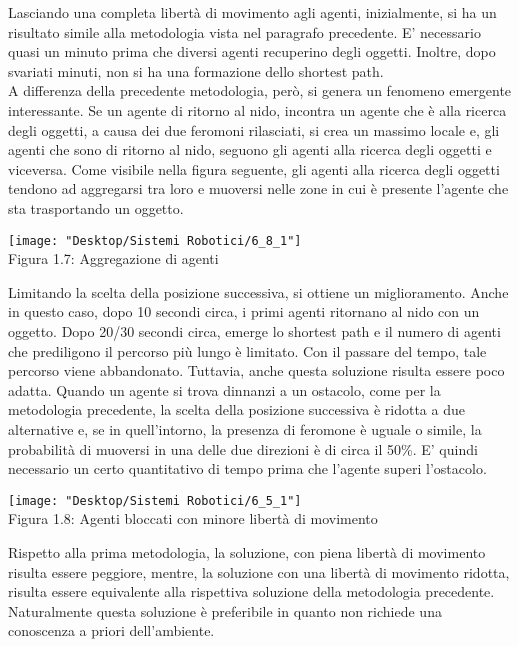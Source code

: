 \documentclass[12pt,a4paper,openright,twoside]{report}
\begin{document}
Lasciando una completa libertà di movimento agli agenti, inizialmente, si ha un risultato simile alla metodologia vista nel paragrafo precedente. E' necessario quasi un minuto prima che diversi agenti recuperino degli oggetti. Inoltre, dopo svariati minuti, non si ha una formazione dello shortest path.
\\A differenza della precedente metodologia, però, si genera un fenomeno emergente interessante. Se un agente di ritorno al nido, incontra un agente che è alla ricerca degli oggetti, a causa dei due feromoni rilasciati, si crea un massimo locale e, gli agenti che sono di ritorno al nido, seguono gli agenti alla ricerca degli oggetti e viceversa. Come visibile nella figura seguente, gli agenti alla ricerca degli oggetti tendono ad aggregarsi tra loro e muoversi nelle zone in cui è presente l'agente che sta trasportando un oggetto.\\

\begin{center}  
	\texttt{[image: "Desktop/Sistemi Robotici/6\_8\_1"]}
	\\Figura 1.7: Aggregazione di agenti
\end{center}

Limitando la scelta della posizione successiva, si ottiene un miglioramento. Anche in questo caso, dopo 10 secondi circa, i primi agenti ritornano al nido con un oggetto. Dopo 20/30 secondi circa, emerge lo shortest path e il numero di agenti che prediligono il percorso più lungo è limitato. Con il passare del tempo, tale percorso viene abbandonato. Tuttavia, anche questa soluzione risulta essere poco adatta. Quando un agente si trova dinnanzi a un ostacolo, come per la metodologia precedente, la scelta della posizione successiva è ridotta a due alternative e, se in quell'intorno, la presenza di feromone è uguale o simile, la probabilità di muoversi in una delle due direzioni è di circa il 50\%. E' quindi necessario un certo quantitativo di tempo prima che l'agente superi l'ostacolo.\\

\begin{center}  
	\texttt{[image: "Desktop/Sistemi Robotici/6\_5\_1"]}
	\\Figura 1.8: Agenti bloccati con minore libertà di movimento
\end{center}

Rispetto alla prima metodologia, la soluzione, con piena libertà di movimento risulta essere peggiore, mentre, la soluzione con una libertà di movimento ridotta, risulta essere equivalente alla rispettiva soluzione della metodologia precedente. Naturalmente questa soluzione è preferibile in quanto non richiede una conoscenza a priori dell'ambiente.
\end{document}
